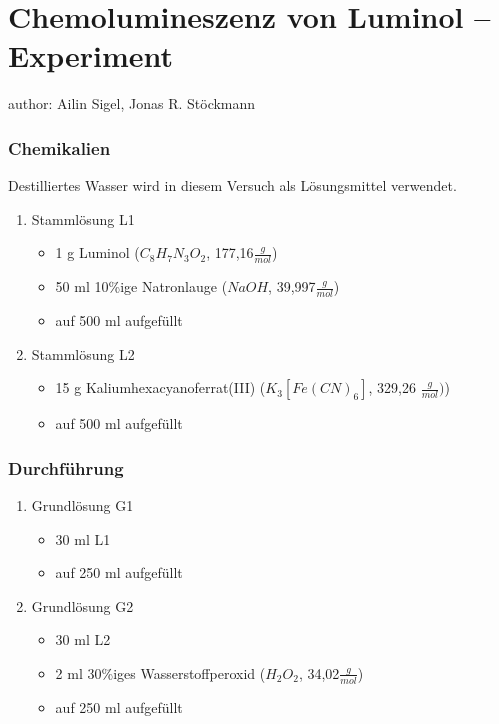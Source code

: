 \section{Chemolumineszenz von Luminol -- Experiment}
author: Ailin Sigel, Jonas R. Stöckmann

\subsubsection*{Chemikalien}

Destilliertes Wasser wird in diesem Versuch als Lösungsmittel verwendet.
\begin{enumerate}

\item Stammlösung L1
\begin{itemize}
\item 1 g Luminol ($C_8H_7N_3O_2$, 177,16$\frac{g}{mol}$)
\item 50 ml 10\%ige Natronlauge ($NaOH$, 39,997$\frac{g}{mol}$)
\item auf 500 ml aufgefüllt
\end{itemize}

\item Stammlösung L2
\begin{itemize}
\item 15 g Kaliumhexacyanoferrat(III) ($K_3[Fe(CN)_6]$, 329,26 $\frac{g}{mol})$)
\item auf 500 ml aufgefüllt 
\end{itemize}
\end{enumerate}

\subsubsection*{Durchführung} 

\begin{enumerate}

\item Grundlösung G1
\begin{itemize}
\item 30 ml L1 
\item auf 250 ml aufgefüllt
\end{itemize}

\item Grundlösung G2
\begin{itemize}
\item 30 ml L2 
\item 2 ml 30\%iges Wasserstoffperoxid ($H_2O_2$, 34,02$\frac{g}{mol}$)
\item auf 250 ml aufgefüllt 
\end{itemize}
\end{enumerate}

